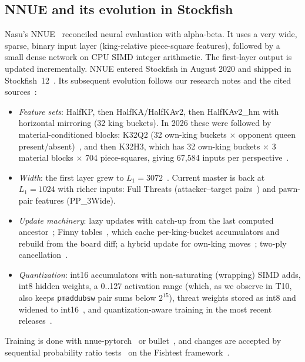 \documentclass[10pt]{article}
\theoremstyle{plain}
\theoremstyle{definition}
\begin{document}
\subsection{NNUE and its evolution in Stockfish}

Nasu's NNUE~\cite{nasu2018} reconciled neural evaluation with alpha-beta.
It uses a very wide, sparse, binary input layer (king-relative piece-square features), followed by a small dense network on CPU SIMD integer arithmetic.
The first-layer output is updated incrementally.
NNUE entered Stockfish in August 2020 and shipped in Stockfish~12~\cite{cpwnnue}.
Its subsequent evolution follows our research notes and the cited sources~\cite{nnuepytorchdocs,sfsource,sfreleases}:
\begin{itemize}[leftmargin=*,itemsep=1pt]
\item \emph{Feature sets}: HalfKP, then HalfKA/HalfKAv2, then HalfKAv2\_hm with horizontal mirroring (32 king buckets).
In 2026 these were followed by material-conditioned blocks: K32Q2 (32 own-king buckets $\times$ opponent queen present/absent)~\cite{sfnnv18}, and then K32H3, which has 32 own-king buckets $\times$ 3 material blocks $\times$ 704 piece-squares, giving 67,584 inputs per perspective~\cite{pr563,sfsource}.
\item \emph{Width}: the first layer grew to $L_1=3072$~\cite{pr5149}.
Current master is back at $L_1=1024$ with richer inputs: Full Threats (attacker--target pairs~\cite{sfthreats,sfsource}) and pawn-pair features (PP\_3Wide).
\item \emph{Update machinery}: lazy updates with catch-up from the last computed ancestor~\cite{sfsource}; Finny tables~\cite{sffinny}, which cache per-king-bucket accumulators and rebuild from the board diff; a hybrid update for own-king moves~\cite{sfsource}; two-ply cancellation~\cite{sfpr5988}.
\item \emph{Quantization}: int16 accumulators with non-saturating (wrapping) SIMD adds, int8 hidden weights, a 0..127 activation range (which, as we observe in T10, also keeps \texttt{pmaddubsw} pair sums below $2^{15}$), threat weights stored as int8 and widened to int16~\cite{nnuepytorchdocs,sfsource}, and quantization-aware training in the most recent releases~\cite{sfreleases}.
\end{itemize}
Training is done with nnue-pytorch~\cite{nnuepytorchdocs} or bullet~\cite{bullet}, and changes are accepted by sequential probability ratio tests~\cite{wald1945} on the Fishtest framework~\cite{fishtest}.
\end{document}
